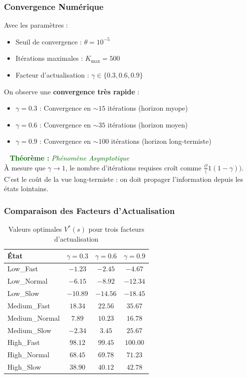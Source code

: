 \documentclass[11pt,a4paper]{article}
\newenvironment{thmbox}[1]{%
  \vspace{3pt}\begin{framed}
  \noindent{\color{DarkGreen}\rule{0.3cm}{3pt}}~%
  \textcolor{DarkGreen}{\textbf{Théorème :} \textit{#1}}\\[3pt]}
  {\end{framed}\vspace{3pt}}
\begin{document}
\subsubsection{Convergence Numérique}

Avec les paramètres :
\begin{itemize}
  \item Seuil de convergence : $\theta = 10^{-5}$
  \item Itérations maximales : $K_{\max} = 500$
  \item Facteur d'actualisation : $\gamma \in \{0.3, 0.6, 0.9\}$
\end{itemize}

On observe une \textbf{convergence très rapide} :
\begin{itemize}
  \item $\gamma = 0.3$ : Convergence en $\sim 15$ itérations (horizon myope)
  \item $\gamma = 0.6$ : Convergence en $\sim 35$ itérations (horizon moyen)
  \item $\gamma = 0.9$ : Convergence en $\sim 100$ itérations (horizon long-termiste)
\end{itemize}

\begin{thmbox}{Phénomène Asymptotique}
À mesure que $\gamma \to 1$, le nombre d'itérations requises croît comme $\mathcal{\frac{O}(1}{(1-\gamma))}$. C'est le coût de la vue long-termiste : on doit propager l'information depuis les états lointains.
\end{thmbox}

\subsubsection{Comparaison des Facteurs d'Actualisation}

\begin{table}[H]
\centering
\caption{Valeurs optimales $V^*(s)$ pour trois facteurs d'actualisation}
\label{tab:value_comparison}
\begin{tabularx}{\linewidth}{|l|c|c|c|}
\hline
\textbf{État} & $\gamma = 0.3$ & $\gamma = 0.6$ & $\gamma = 0.9$ \\
\hline
Low\_Fast & $-1.23$ & $-2.45$ & $-4.67$ \\
Low\_Normal & $-6.15$ & $-8.92$ & $-12.34$ \\
Low\_Slow & $-10.89$ & $-14.56$ & $-18.45$ \\
Medium\_Fast & $18.34$ & $22.56$ & $35.67$ \\
Medium\_Normal & $7.89$ & $10.23$ & $16.78$ \\
Medium\_Slow & $-2.34$ & $3.45$ & $25.67$ \\
High\_Fast & $98.12$ & $99.45$ & $100.00$ \\
High\_Normal & $68.45$ & $69.78$ & $71.23$ \\
High\_Slow & $38.90$ & $40.12$ & $42.78$ \\
\hline
\end{tabularx}
\end{table}
\end{document}
